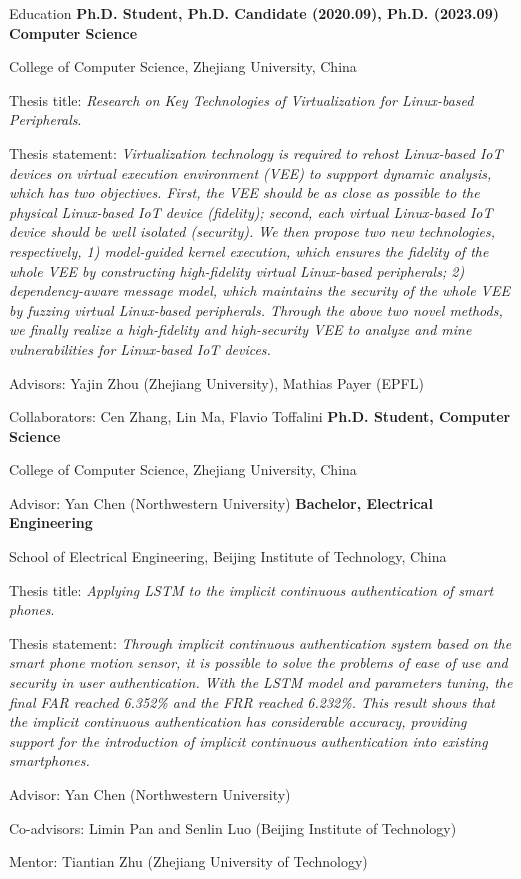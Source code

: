 \begin{rubric}{Education}
\entry*[2019.05 -- 2023.09]
	\textbf{Ph.D. Student, Ph.D. Candidate (2020.09), Ph.D. (2023.09) Computer Science}
	\par {College of Computer Science, Zhejiang University, China}
	\par Thesis title: 
	\emph{Research on Key Technologies of Virtualization for Linux-based Peripherals}.
	\par Thesis statement:
	\emph{Virtualization technology is required to rehost Linux-based IoT
	devices on virtual execution environment (VEE) to suppport dynamic analysis,
	which has two objectives. First, the VEE should be as close as possible to
	the physical Linux-based IoT device (fidelity); second, each virtual
	Linux-based IoT device should be well isolated (security). We then propose
	two new technologies, respectively, 1) model-guided kernel execution, which
	ensures the fidelity of the whole VEE by constructing high-fidelity virtual
	Linux-based peripherals; 2) dependency-aware message model, which maintains
	the security of the whole VEE by fuzzing virtual Linux-based peripherals.
	Through the above two novel methods, we finally realize a high-fidelity and
	high-security VEE to analyze and mine vulnerabilities for Linux-based IoT
	devices.}

	\par Advisors: Yajin Zhou (Zhejiang University), Mathias Payer (EPFL)
	\par Collaborators: Cen Zhang, Lin Ma, Flavio Toffalini
\entry*[2018.09 -- 2019.05]
	\textbf{Ph.D. Student, Computer Science}
	\par {College of Computer Science, Zhejiang University, China}
	\par Advisor: Yan Chen (Northwestern University)
\entry*[2014.09 -- 2018.06]
	\textbf{Bachelor, Electrical Engineering}
	\par {School of Electrical Engineering, Beijing Institute of Technology, China} 
	\par Thesis title: 
	\emph{Applying LSTM to the implicit continuous authentication of smart phones}.
	\par Thesis statement:
	\emph{Through implicit continuous authentication system based on the 
	smart phone motion sensor, it is possible to solve the problems of ease of use
	and security in user authentication. With the LSTM model and parameters tuning, 
	the final FAR reached 6.352\% and the FRR reached 6.232\%. This result shows that
	the implicit continuous authentication has considerable accuracy, providing
	support for the introduction of implicit continuous authentication into existing
	smartphones.}
	\par Advisor: Yan Chen (Northwestern University)
	\par Co-advisors: Limin Pan and Senlin Luo (Beijing Institute of Technology)
	\par Mentor: Tiantian Zhu (Zhejiang University of Technology)
\end{rubric}